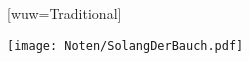 [wuw={Traditional}]

\beginverse
\endverse

\centering\texttt{[image: Noten/SolangDerBauch.pdf]}


\endsong

\beginscripture{}

\endscripture

\begin{intersong}

\end{intersong}